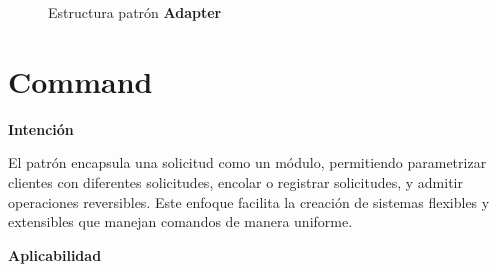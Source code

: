 \begin{figure}[h]
\caption{Estructura patrón \textbf{Adapter}}
\begin{center}
\end{center}
\end{figure}


\section{Command}


\textbf{Intención}

El patrón encapsula una solicitud como un módulo, permitiendo parametrizar clientes con diferentes solicitudes, encolar o registrar solicitudes, y admitir operaciones reversibles. Este enfoque facilita la creación de sistemas flexibles y extensibles que manejan comandos de manera uniforme.

\textbf{Aplicabilidad}


